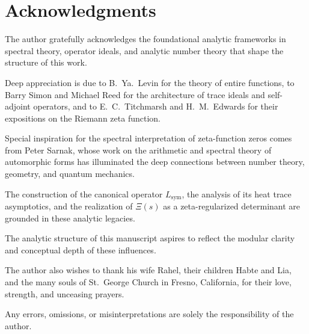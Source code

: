 \section*{Acknowledgments}

The author gratefully acknowledges the foundational analytic frameworks in spectral theory, operator ideals, and analytic number theory that shape the structure of this work.

Deep appreciation is due to B.~Ya.~Levin for the theory of entire functions, to Barry Simon and Michael Reed for the architecture of trace ideals and self-adjoint operators, and to E.~C.~Titchmarsh and H.~M.~Edwards for their expositions on the Riemann zeta function.

Special inspiration for the spectral interpretation of zeta-function zeros comes from Peter Sarnak, whose work on the arithmetic and spectral theory of automorphic forms has illuminated the deep connections between number theory, geometry, and quantum mechanics.

The construction of the canonical operator \( L_{\mathrm{sym}} \), the analysis of its heat trace asymptotics, and the realization of \( \Xi(s) \) as a zeta-regularized determinant are grounded in these analytic legacies.

\vspace{0.5em}
\noindent
The analytic structure of this manuscript aspires to reflect the modular clarity and conceptual depth of these influences.

\vspace{0.5em}
\noindent
The author also wishes to thank his wife Rahel, their children Habte and Lia, and the many souls of St.~George Church in Fresno, California, for their love, strength, and unceasing prayers.

\vspace{0.5em}
\noindent
Any errors, omissions, or misinterpretations are solely the responsibility of the author.
